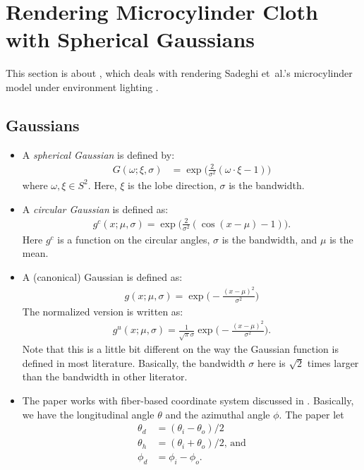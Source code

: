 \documentclass[10pt]{article}
\newcommand{\etal}{{et~al.}}
\begin{document}
  \section{Rendering Microcylinder Cloth with Spherical Gaussians}

  This section is about \cite{Iwasaki:2014}, which deals with rendering Sadeghi \etal's microcylinder model under environment lighting \cite{Sadeghi:2013}.

  \subsection{Gaussians}
  \begin{itemize}
    \item A \emph{spherical Gaussian} is defined by:
    \begin{align*}
      G(\omega; \xi, \sigma) &= \exp \bigg( \frac{2}{\sigma^2} (\omega \cdot \xi - 1) \bigg)
    \end{align*}
    where $\omega, \xi \in S^2$.  Here, $\xi$ is the lobe direction, $\sigma$ is the bandwidth.

    \item A \emph{circular Gaussian} is defined as:
    \begin{align*}
      g^c(x;\mu,\sigma) = \exp \bigg( \frac{2}{\sigma^2}(\cos(x-\mu) - 1) \bigg).
    \end{align*}
    Here $g^c$ is a function on the circular angles, $\sigma$ is the bandwidth, and $\mu$ is the mean.    

    \item A (canonical) Gaussian is defined as:
    \begin{align*}
      g(x; \mu, \sigma) = \exp \bigg( - \frac{(x-\mu)^2}{\sigma^2} \bigg)
    \end{align*}  
    The normalized version is written as:
    \begin{align*}
      g^u(x; \mu, \sigma) = \frac{1}{\sqrt{\pi} \sigma} \exp \bigg( - \frac{(x - \mu)^2}{\sigma^2} \bigg).
    \end{align*}
    Note that this is a little bit different on the way the Gaussian function is defined in most literature.  Basically, the bandwidth $\sigma$ here is $\sqrt{2}$ times larger than the bandwidth in other literator.

    \item The paper works with fiber-based coordinate system discussed in \cite{Marschner:2003}.  Basically, we have the longitudinal angle $\theta$ and the azimuthal angle $\phi$.  The paper let
    \begin{align*}
      \theta_d &= (\theta_i - \theta_o)/2 \\
      \theta_h &= (\theta_i + \theta_o)/2\mbox{, and} \\
      \phi_d &= \phi_i - \phi_o.
    \end{align*}     


\end{itemize}
\end{document}
